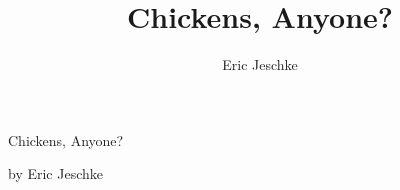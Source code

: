 \documentclass[10pt,final,openany]{book}
\title{Chickens, Anyone?}
\author{Eric Jeschke}
\begin{document}
\pagestyle{empty}

\vspace*{3in}
\begin{center}
{\Huge Chickens, Anyone?}

{\Large by Eric Jeschke}
\end{center}

\newpage


\end{document}
